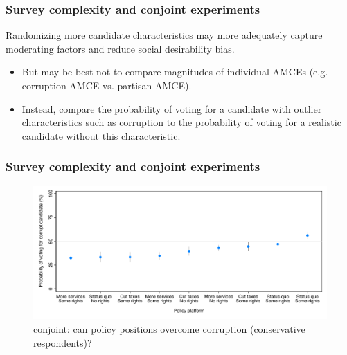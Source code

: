 \documentclass[usenames,dvipsnames]{beamer}
\begin{document}
\begin{frame}
\frametitle{Survey complexity and conjoint experiments}
Randomizing more candidate characteristics may more adequately capture moderating factors and reduce social desirability bias.
\begin{itemize}
\pause
\item But may be best not to compare magnitudes of individual AMCEs (e.g. corruption AMCE vs. partisan AMCE). 
\pause
\item Instead, compare the probability of voting for a candidate with outlier characteristics such as corruption to the probability of voting for a realistic candidate without this characteristic.
\end{itemize}

\end{frame}

\begin{frame}
\frametitle{Survey complexity and conjoint experiments}

\begin{figure}[!hb]
\hspace*{-11mm}
\includegraphics[scale = 0.77]{../figs/fz_margins_right.pdf}
\vspace{0.2cm}
\caption{\citet{franchino2015voting} conjoint: can policy positions overcome corruption (conservative respondents)?}
\small
\vspace{-0.3cm}
\label{fig: fz_margins_right}
\end{figure}

\end{frame}
\end{document}
